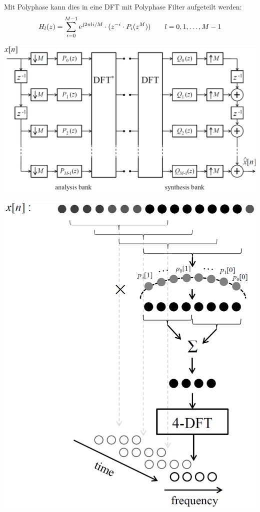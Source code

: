 Mit Polyphase kann dies in eine DFT mit Polyphase Filter aufgeteilt werden:
\[ H_l(z) = \sum_{i=0}^{M-1}\e^{\im 2\pi li/M} \cdot (z^{-i} \cdot P_i(z^M) )
	\qquad l=0,1,\ldots,M-1 \]
\begin{minipage}{.6\textwidth}
	\includegraphics[width=\textwidth]{../fig/dft_filterbank}
\end{minipage}
\begin{minipage}{.4\textwidth}
	\includegraphics[width=\textwidth]{../fig/dft_filter_ill}
\end{minipage}
